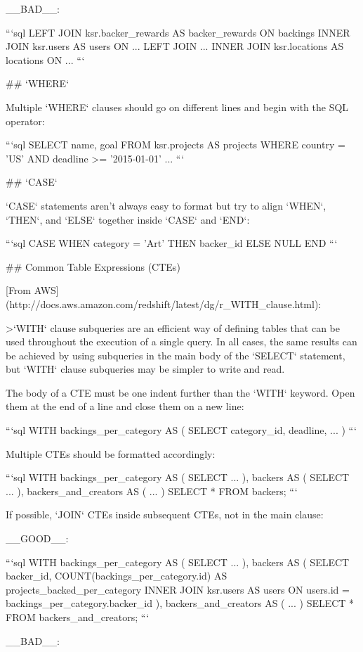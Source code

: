 __BAD__:

```sql
LEFT JOIN ksr.backer_rewards AS backer_rewards ON backings
INNER JOIN ksr.users AS users ON ...
LEFT JOIN ...
INNER JOIN ksr.locations AS locations ON ...
```

## `WHERE`

Multiple `WHERE` clauses should go on different lines and begin with the SQL operator:

```sql
SELECT
  name,
  goal
FROM ksr.projects AS projects
WHERE
  country = 'US'
  AND deadline >= '2015-01-01'
...
```

## `CASE`

`CASE` statements aren't always easy to format but try to align `WHEN`, `THEN`, and `ELSE` together inside `CASE` and `END`:

```sql
CASE WHEN category = 'Art'
     THEN backer_id
     ELSE NULL
END
```

## Common Table Expressions (CTEs)

[From AWS](http://docs.aws.amazon.com/redshift/latest/dg/r_WITH_clause.html):

>`WITH` clause subqueries are an efficient way of defining tables that can be used throughout the execution of a single query. In all cases, the same results can be achieved by using subqueries in the main body of the `SELECT` statement, but `WITH` clause subqueries may be simpler to write and read.

The body of a CTE must be one indent further than the `WITH` keyword. Open them at the end of a line and close them on a new line:

```sql
WITH backings_per_category AS (
  SELECT
    category_id,
    deadline,
    ...
)
```

Multiple CTEs should be formatted accordingly:

```sql
WITH backings_per_category AS (
  SELECT
    ...
), backers AS (
  SELECT
    ...
), backers_and_creators AS (
  ...
)
SELECT * FROM backers;
```

If possible, `JOIN` CTEs inside subsequent CTEs, not in the main clause:

__GOOD__:

```sql
WITH backings_per_category AS (
  SELECT
    ...
), backers AS (
  SELECT
    backer_id,
    COUNT(backings_per_category.id) AS projects_backed_per_category
  INNER JOIN ksr.users AS users ON users.id = backings_per_category.backer_id
), backers_and_creators AS (
  ...
)
SELECT * FROM backers_and_creators;
```

__BAD__:

